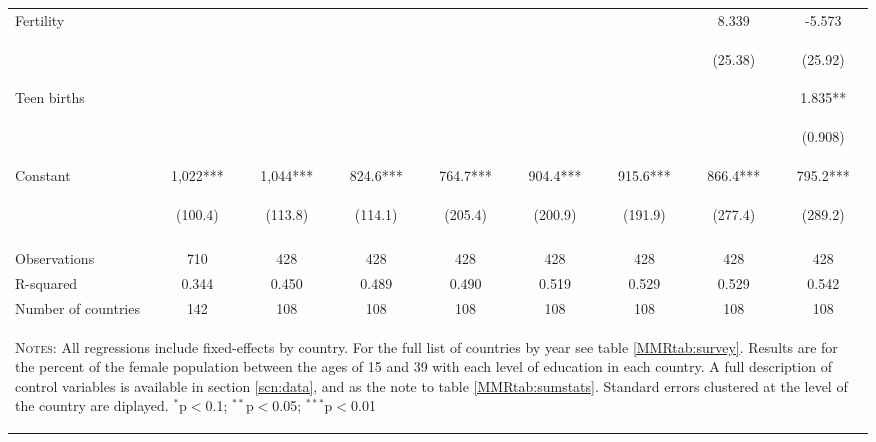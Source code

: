 \begin{landscape}
\begin{table}[htpb!]
\begin{center}
\begin{tabular}{lcccccccc}
Fertility&&&&&&&8.339&-5.573\\
&&&&&&&\begin{footnotesize}(25.38)\end{footnotesize}&\begin{footnotesize}(25.92)\end{footnotesize}\\
Teen births&&&&&&&&1.835**\\
&&&&&&&&\begin{footnotesize}(0.908)\end{footnotesize}\\
Constant&1,022***&1,044***&824.6***&764.7***&904.4***&915.6***&866.4***&795.2***\\
&\begin{footnotesize}(100.4)\end{footnotesize}&\begin{footnotesize}(113.8)\end{footnotesize}&\begin{footnotesize}(114.1)\end{footnotesize}&\begin{footnotesize}(205.4)\end{footnotesize}&\begin{footnotesize}(200.9)\end{footnotesize}&\begin{footnotesize}(191.9)\end{footnotesize}&\begin{footnotesize}(277.4)\end{footnotesize}&\begin{footnotesize}(289.2)\end{footnotesize}\\
&&&&&&&&\\
Observations&710&428&428&428&428&428&428&428\\
R-squared&0.344&0.450&0.489&0.490&0.519&0.529&0.529&0.542\\
Number of countries&142&108&108&108&108&108&108&108\\
\midrule
\multicolumn{9}{p{20cm}}{\begin{footnotesize}\textsc{Notes:} All regressions include fixed-effects by country. For the full list of countries by year see table \ref{MMRtab:survey}.  Results are for the percent of the female population between the ages of  15 and 39 with each level of education in each country.  A full description of control variables is available in section \ref{scn:data}, and as the note to table \ref{MMRtab:sumstats}.  Standard errors clustered at the level of the country are diplayed.
$^{*}$p$<$0.1; $^{**}$p$<$0.05; $^{***}$p$<$0.01\end{footnotesize}} \\ \bottomrule 
\end{tabular}\end{center}\end{table}\end{landscape}